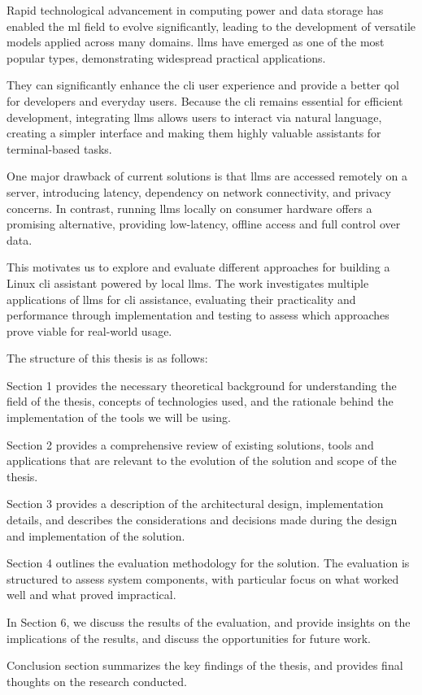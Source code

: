 Rapid technological advancement in computing power and data storage has enabled
the \gls{ml} field to evolve significantly, leading to the development of
versatile models applied across many domains. \Glspl{llm} have emerged as one of
the most popular types, demonstrating widespread practical applications.

They can significantly enhance the \gls{cli} user experience and
provide a better \gls{qol} for developers and everyday users. Because the
\gls{cli} remains essential for efficient development, integrating \glspl{llm}
allows users to interact via natural language, creating a simpler interface and
making them highly valuable assistants for terminal-based tasks.

One major drawback of current solutions is that \glspl{llm} are accessed
remotely on a server, introducing latency, dependency on network connectivity,
and privacy concerns. In contrast, running \glspl{llm} locally on consumer
hardware offers a promising alternative, providing low-latency, offline access
and full control over data.

This motivates us to explore and evaluate different approaches for building a
Linux \gls{cli} assistant powered by local \glspl{llm}. The work investigates
multiple applications of \glspl{llm} for \gls{cli} assistance, evaluating their
practicality and performance through implementation and testing to assess which
approaches prove viable for real-world usage.

The structure of this thesis is as follows:

Section 1 provides the necessary theoretical background for understanding the
field of the thesis, concepts of technologies used, and the rationale behind the
implementation of the tools we will be using.

Section 2 provides a comprehensive review of existing solutions, tools and
applications that are relevant to the evolution of the solution and scope of the
thesis.

Section 3 provides a description of the architectural design, implementation
details, and describes the considerations and decisions made during the design
and implementation of the solution.

Section 4 outlines the evaluation methodology for the solution. The
evaluation is structured to assess system components, with particular focus on
what worked well and what proved impractical.

In Section 6, we discuss the results of the evaluation, and provide insights
on the implications of the results, and discuss the opportunities for future
work.

Conclusion section summarizes the key findings of the thesis, and provides final
thoughts on the research conducted.
